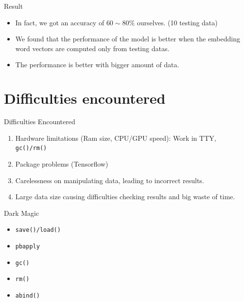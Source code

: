 \documentclass{beamer}
\begin{document}
\begin{frame}{Result}
    \begin{itemize}
        \item In fact, we got an accuracy of $60\sim 80\%$ ourselves. (10 testing data)
        \item We found that the performance of the model is better 
            when the embedding word vectors are computed only from testing datas.
        \item The performance is better with bigger amount of data.
    \end{itemize}
\end{frame}
\section{Difficulties encountered}%
\label{sec:difficulties_encountered}


\begin{frame}{Difficulties Encountered}
	\begin{enumerate}
		\item Hardware limitations (Ram size, CPU/GPU speed): Work in TTY, \texttt{gc()/rm()}
		\item Package problems (Tensorflow)
		\item Carelessness on manipulating data, leading to incorrect results.
		\item Large data size causing difficulties checking results and big waste of time.
	\end{enumerate}
\end{frame}


\begin{frame}{Dark Magic}
	\begin{itemize}
		\item \texttt{save()/load()}
		\item \texttt{pbapply}
		\item \texttt{gc()}
		\item \texttt{rm()}
		\item \texttt{abind()}
	\end{itemize}
	
\end{frame}
\end{document}
